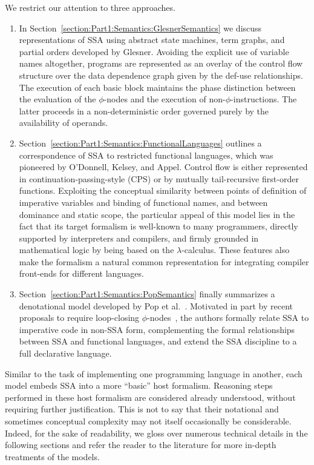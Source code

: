 We restrict our attention to three
approaches.
\begin{enumerate}
\item In Section~\ref{section:Part1:Semantics:GlesnerSemantics} we discuss representations of SSA using abstract state machines, term graphs, and partial orders developed
  by Glesner. Avoiding the explicit use of variable names altogether,
  programs are represented as an overlay of the control flow structure
  over the data dependence graph given by the def-use
  relationships. The execution of each basic block maintains the phase
  distinction between the evaluation of the $\phi$-nodes and the
  execution of non-$\phi$-instructions. The latter proceeds in a
  non-deterministic order governed purely by the availability of
  operands.
\item Section~\ref{section:Part1:Semantics:FunctionalLanguages} outlines a correspondence of SSA to restricted functional languages, which was
  pioneered by O'Donnell, Kelsey, and Appel. Control flow is either
  represented in continuation-passing-style (CPS) or by 
  mutually tail-recursive first-order functions. Exploiting the
  conceptual similarity between points of definition of imperative
  variables and binding of functional names, and between dominance and
  static scope, the particular appeal of this model lies in the fact
  that its target formalism is well-known to many programmers,
  directly supported by interpreters and compilers, and firmly
  grounded in mathematical logic by being based on the
  $\lambda$-calculus. These features also make the formalism a natural
  common representation for integrating compiler front-ends for
  different languages.
\item Section~\ref{section:Part1:Semantics:PopSemantics} finally summarizes a denotational model developed by Pop et al.~\cite{PopJS2007}. Motivated in part by recent proposals to require loop-closing $\phi$-nodes~\cite{}, the authors formally relate SSA to imperative code in non-SSA form, complementing the formal relationships between SSA and functional languages, and extend the SSA discipline to a full declarative language. 
\end{enumerate}
Similar to the task of implementing one programming language in
another, each model embeds SSA into a more ``basic'' host
formalism. Reasoning steps performed in these host formalism are
considered already understood, without requiring further
justification.  This is not to say that their notational and sometimes
conceptual complexity may not itself occasionally be
considerable. Indeed, for the sake of readability, we gloss over
numerous technical details in the following sections and refer the
reader to the literature for more in-depth treatments of the models.

